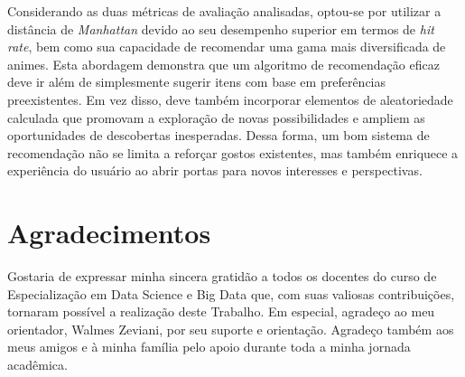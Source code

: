 \documentclass[twocolumn]{rbef}
\newcommand{\1}{\mathbbm{1}}
\begin{document}
Considerando as duas métricas de avaliação analisadas, optou-se por utilizar a distância de \textit{Manhattan} devido ao seu desempenho superior em termos de \textit{hit rate}, bem como sua capacidade de recomendar uma gama mais diversificada de animes. Esta abordagem demonstra que um algoritmo de recomendação eficaz deve ir além de simplesmente sugerir itens com base em preferências preexistentes. Em vez disso, deve também incorporar elementos de aleatoriedade calculada que promovam a exploração de novas possibilidades e ampliem as oportunidades de descobertas inesperadas. Dessa forma, um bom sistema de recomendação não se limita a reforçar gostos existentes, mas também enriquece a experiência do usuário ao abrir portas para novos interesses e perspectivas.


\section{Agradecimentos}

Gostaria de expressar minha sincera gratidão a todos os docentes do curso de Especialização em Data Science e Big Data que, com suas valiosas contribuições, tornaram possível a realização deste Trabalho. Em especial, agradeço ao meu orientador, Walmes Zeviani, por seu suporte e orientação. Agradeço também aos meus amigos e à minha família pelo apoio durante toda a minha jornada acadêmica.
\end{document}
